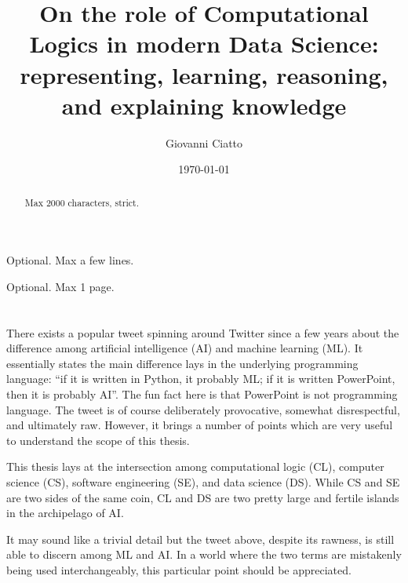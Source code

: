 \documentclass[12pt,a4paper,openright,twoside]{book}
\title{On the role of Computational Logics in modern Data Science: representing, learning, reasoning, and explaining knowledge}
\author{Giovanni Ciatto}
\date{\today}
\begin{document}
	
\frontmatter



\begin{abstract}	
Max 2000 characters, strict.
\end{abstract}

\begin{dedication} %
Optional. Max a few lines.
\end{dedication}

\begin{acknowledgements} %
Optional. Max 1 page.
\end{acknowledgements}

\tableofcontents   
\listoffigures     %
\lstlistoflistings %

\mainmatter

\chapter{\introductionname}
\label{chap:introduction}

There exists a popular tweet spinning around Twitter since a few years about the difference among artificial intelligence (AI) and machine learning (ML).
%
It essentially states the main difference lays in the underlying programming language: ``if it is written in Python, it probably ML; if it is written PowerPoint, then it is probably AI''.
%
The fun fact here is that PowerPoint is not programming language.
%
The tweet is of course deliberately provocative, somewhat disrespectful, and ultimately raw.
%
However, it brings a number of points which are very useful to understand the scope of this thesis.

This thesis lays at the intersection among computational logic (CL), computer science (CS), software engineering (SE), and data science (DS).
%
While CS and SE are two sides of the same coin, CL and DS are two pretty large and fertile islands in the archipelago of AI.

It may sound like a trivial detail but the tweet above, despite its rawness, is still able to discern among ML and AI.
%
In a world where the two terms are mistakenly being used interchangeably, this particular point should be appreciated.
\end{document}
